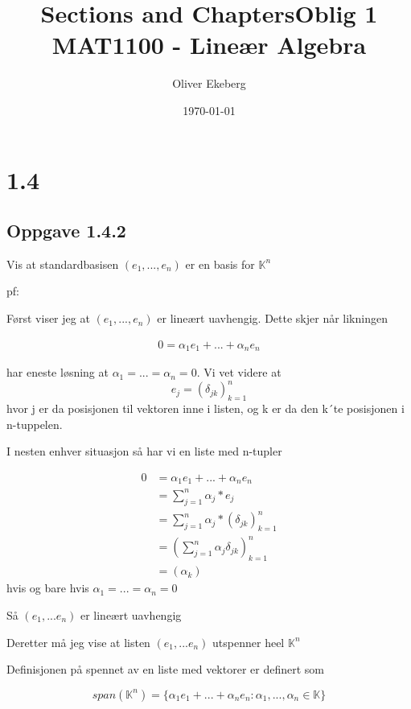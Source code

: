 \documentclass[11pt]{article}
\title{Sections and Chapters}
\title{Oblig 1 \\ MAT1100 - Lineær Algebra}
\author{Oliver Ekeberg}
\date{\today}
\begin{document}
\maketitle


\tableofcontents


\section{1.4}

\subsection{Oppgave 1.4.2}

Vis at standardbasisen $(e_1, ..., e_n)$ er en basis for $\mathbb{K}^n$

pf:

\vspace{1em}
Først viser jeg at $(e_1,...,e_n)$ er lineært uavhengig. Dette skjer når likningen

\begin{align*}
    0 = \alpha_1 e_1 + ... + \alpha_n e_n     
\end{align*}

har eneste løsning at $\alpha_1=...=\alpha_n=0$. Vi vet videre at $$e_j = (\delta_{jk})^{n}_{k=1}$$ hvor j er da posisjonen til 
vektoren inne i listen, og k er da den k´te posisjonen i n-tuppelen. 

I nesten enhver situasjon så har vi en liste med n-tupler

\begin{align*}
    0 &= \alpha_1 e_1 + ... + \alpha_n e_n \\
    &= \sum_{j=1}^{n} \alpha_j * e_j \\
    &= \sum_{j=1}^{n} \alpha_j * (\delta_{jk})^{n}_{k=1} \\
    &= (\sum_{j=1}^{n} \alpha_j \delta_{jk})^n_{k=1} \\
    &= (\alpha_k)
\end{align*}
hvis og bare hvis $\alpha_1= ... = \alpha_n = 0$  

Så $(e_1,...e_n)$ er lineært uavhengig

\vspace{1em}
Deretter må jeg vise at listen $(e_1,...e_n)$ utspenner heel $\mathbb{K}^n$

Definisjonen på spennet av en liste med vektorer er definert som

$$
span(\mathbb{K}^n) = \{ \alpha_1 e_1 + ... + \alpha_n e_n  : \alpha_1,...,\alpha_n \in \mathbb{K} \}
$$
\end{document}
